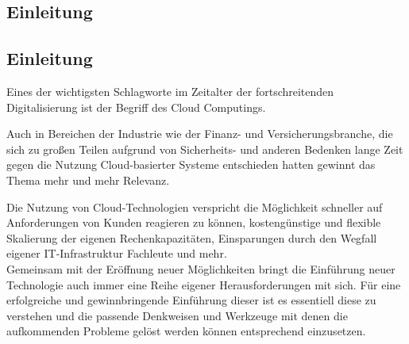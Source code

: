 \begin{spacing}{1.2}

\chapter{Einleitung}
\label{sec:einl}

\section{Einleitung}
Eines der wichtigsten Schlagworte im Zeitalter der fortschreitenden
Digitalisierung ist der Begriff des Cloud Computings.


Auch in Bereichen
der Industrie wie der Finanz-
und Versicherungsbranche, die sich zu großen Teilen aufgrund von
Sicherheits- und anderen Bedenken lange Zeit gegen die Nutzung
Cloud-basierter Systeme entschieden hatten gewinnt das Thema mehr und mehr
Relevanz.

Die Nutzung von Cloud-Technologien verspricht die Möglichkeit
schneller auf Anforderungen von Kunden reagieren zu können,
kostengünstige und flexible Skalierung der eigenen Rechenkapazitäten,
Einsparungen durch den Wegfall eigener IT-Infrastruktur Fachleute und mehr.\\
Gemeinsam mit der Eröffnung neuer Möglichkeiten bringt die Einführung neuer
Technologie auch immer eine Reihe eigener Herausforderungen
mit sich. Für eine erfolgreiche und gewinnbringende Einführung dieser ist
es essentiell diese zu verstehen und die passende Denkweisen und Werkzeuge
mit denen die aufkommenden Probleme gelöst werden können entsprechend
einzusetzen.


\end{spacing}
